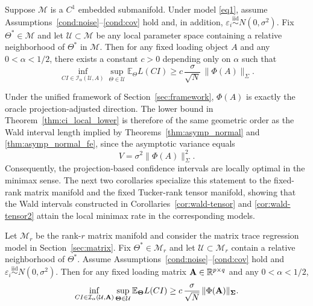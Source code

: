 \documentclass[authoryear,preprint,review,12pt]{elsarticle}
\begin{document}
\begin{thm}\label{thm:ci_local_lower}
	Suppose $\mathcal M$ is a $C^1$ embedded submanifold.
	Under model \eqref{eq1}, assume Assumptions~\ref{cond:noise}--\ref{cond:cov} hold and, in addition, $\varepsilon_i\stackrel{\mathrm{iid}}{\sim}N(0,\sigma^2)$.
	Fix $\Theta^\ast\in\mathcal M$ and let $\mathcal U\subset\mathcal M$ be any local parameter space containing a relative neighborhood of $\Theta^\ast$ in $\mathcal M$.
	Then for any fixed loading object $A$ and any $0<\alpha<1/2$, there exists a constant $c>0$ depending only on $\alpha$ such that
	\[
	\inf_{CI\in\mathcal I_\alpha(\mathcal U,A)}
	\sup_{\Theta\in\mathcal U}\mathbb E_\Theta L(CI)
	\ge
	c\,\frac{\sigma}{\sqrt N}\,\|\Phi(A)\|_\Sigma.
	\]
\end{thm}

Under the unified framework of Section~\ref{sec:framework}, $\Phi(A)$ is exactly the oracle projection-adjusted direction.
The lower bound in Theorem~\ref{thm:ci_local_lower} is therefore of the same geometric order as the Wald interval length implied by Theorems~\ref{thm:asymp_normal} and \ref{thm:asymp_normal_fe}, since the asymptotic variance equals
\[
V=\sigma^2\|\Phi(A)\|_\Sigma^2.
\]
Consequently, the projection-based confidence intervals are locally optimal in the minimax sense.
The next two corollaries specialize this statement to the fixed-rank matrix manifold and the fixed Tucker-rank tensor manifold, showing that the Wald intervals constructed in Corollaries~\ref{cor:wald-tensor} and \ref{cor:wald-tensor2} attain the local minimax rate in the corresponding models.

\begin{cor}\label{cor:ci_matrix_local}
	Let $\mathcal M_r$ be the rank-$r$ matrix manifold and consider the matrix trace regression model in Section~\ref{sec:matrix}.
	Fix $\Theta^\ast\in\mathcal M_r$ and let $\mathcal U\subset\mathcal M_r$ contain a relative neighborhood of $\Theta^\ast$.
	Assume Assumptions~\ref{cond:noise}--\ref{cond:cov} hold and $\varepsilon_i\stackrel{\mathrm{iid}}{\sim}N(0,\sigma^2)$.
	Then for any fixed loading matrix $\mathbf{A}\in\mathbb R^{p\times q}$ and any $0<\alpha<1/2$,
	\[
	\inf_{CI\in\mathcal I_\alpha(\mathcal U,\mathbf{A})}
	\sup_{\mathbf{\Theta}\in\mathcal U}\mathbb E_{\mathbf{\Theta}}L(CI)
	\ge
	c\,\frac{\sigma}{\sqrt N}\,\|\Phi(\mathbf{A})\|_{\mathbf{ \Sigma}}.
	\]
\end{cor}
\end{document}
